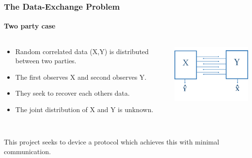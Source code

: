 \documentclass[xcolor=dvipsnames]{beamer}
\begin{document}
\begin{frame}[label = twoparty]
\frametitle{The Data-Exchange Problem}
\framesubtitle{Two party case}
\begin{minipage}[0.9\textheight]{\textwidth}
\begin{columns}
\begin{column}{0.4\textwidth}
\begin{itemize}
\item Random correlated data (X,Y) is distributed between two parties.
\item The first observes X and second observes Y.
\item They seek to recover each others data.
\item The joint distribution of X and Y is unknown.
\end{itemize}
\end{column}
\begin{column}{0.5\textwidth}
\includegraphics[width=5.2cm]{./dataexp.png}
\end{column}
\end{columns}
\end{minipage}\\
\vspace{0.5cm}
This project seeks to device a protocol which achieves this with minimal communication. 
\end{frame}
\end{document}
